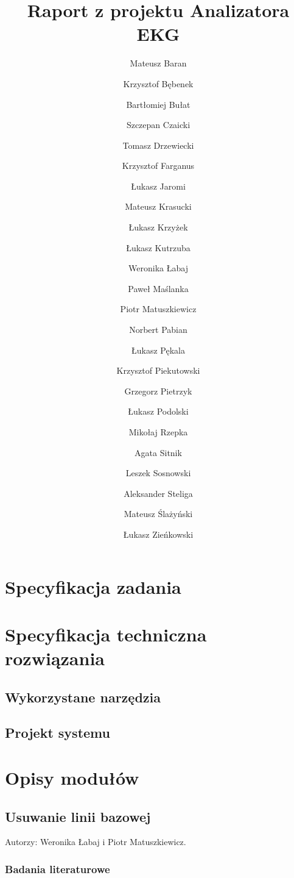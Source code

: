 \documentclass[a4paper, 11pt]{article}
\begin{document}
\title{Raport z projektu Analizatora EKG}
\author{Mateusz Baran \and
Krzysztof Bębenek \and
Bartłomiej Bułat \and
Szczepan Czaicki \and
Tomasz Drzewiecki \and
Krzysztof Farganus \and
Łukasz Jaromi \and
Mateusz Krasucki \and
Łukasz Krzyżek \and
Łukasz Kutrzuba \and
Weronika Łabaj \and
Paweł Maślanka \and
Piotr Matuszkiewicz \and
Norbert Pabian \and
Łukasz Pękala \and
Krzysztof Piekutowski \and
Grzegorz Pietrzyk \and
Łukasz Podolski \and
Mikołaj Rzepka \and
Agata Sitnik \and
Leszek Sosnowski \and
Aleksander Steliga \and
Mateusz Ślażyński \and
Łukasz Zieńkowski}


\maketitle
\newpage

\tableofcontents
\newpage

\section{Specyfikacja zadania}

\section{Specyfikacja techniczna rozwiązania}

\subsection{Wykorzystane narzędzia}

\subsection{Projekt systemu}

\section{Opisy modułów}

\subsection{Usuwanie linii bazowej}

Autorzy: Weronika Łabaj i Piotr Matuszkiewicz.

\subsubsection{Badania literaturowe}
\end{document}
